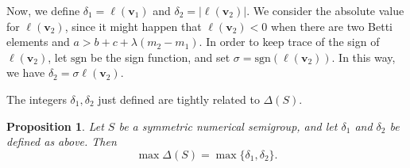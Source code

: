 \documentclass[11pt]{amsart}
\newtheorem{proposition}[theorem]{Proposition}
\theoremstyle{remark}
\begin{document}
 Now, we define $\delta_1=\ell(\mathbf v_1)$ and $\delta_2=|\ell(\mathbf v_2)|$.  We consider the absolute value for $\ell(\mathbf v_2)$, since it might happen that $\ell(\mathbf v_2)<0$ when there are two Betti elements and  $a>b+c+\lambda(m_2-m_1)$. In order to keep trace of the sign of $\ell(\mathbf v_2)$, let $\mathrm{sgn}$ be the sign function, and set $\sigma=\mathrm{sgn}(\ell(\mathbf v_2))$. In this way, we have $\delta_2=\sigma\ell(\mathbf v_2)$.  
 
 The integers $\delta_1,\delta_2$ just defined are tightly related to $\Delta(S)$.

\begin{proposition}\label{max-delta}
Let $S$ be a symmetric numerical semigroup, and let $\delta_1$ and $\delta_2$ be defined as above. Then \[\max\Delta(S)=\max\{\delta_1,\delta_2\}.\] 
\end{proposition}
\end{document}
